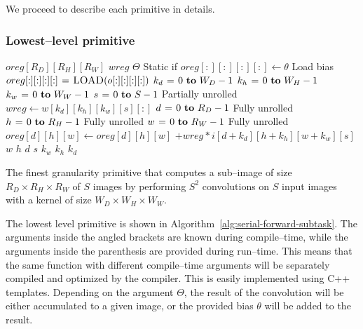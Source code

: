   We proceed to describe each primitive in details.

  \subsubsection{Lowest--level primitive}

  \begin{algorithm}
    {\footnotesize
      \begin{codebox}
        \li {} $oreg[R_D][R_H][R_W]$
        \li {} $wreg$
        \li \If $\Theta$ \Comment Static if
        \li \Then $oreg[:][:][:][:] \gets \theta$ \Comment Load bias
        \li \Else
        \li       $oreg[:][:][:][:] \mathrel{\hspace{1pt}=\hspace{1pt}} \textnormal{\scshape LOAD}(o[:][:][:][:])$
        \End \li {}
        \li {} $k_d \gets 0 \To W_D-1$
        \li   \Do {} $k_h \gets 0 \To W_H-1$
        \li      \Do {} $k_w \gets 0 \To W_W-1$
        \li         \Do {} $s \gets 0 \To S - 1$ \Comment Partially unrolled
        \li         \Do $wreg \gets w[k_d][k_h][k_w][s][:]$
        \li {} $d \gets 0 \To R_D-1$ \Comment Fully unrolled
        \li   \Do {} $h \gets 0 \To R_H-1$ \Comment Fully unrolled
        \li      \Do {} $w \gets 0 \To R_W-1$ \Comment Fully unrolled
        \li         \Do $oreg[d][h][w] \gets oreg[d][h][w]$
        \li             $+ wreg * i[d+k_d][h+k_h][w+k_w][s]$
        \End \li {} $w$
        \End \li {} $h$
        \End \li {} $d$
        \End \li {} $s$
        \End \li {} $k_w$
        \End \li {} $k_h$
        \End \li {} $k_d$
      \end{codebox}
    \caption{The finest granularity primitive that computes a
      sub--image of size $R_D \times R_H \times R_W$ of $S$ images by
      performing $S^2$ convolutions on $S$ input images with a kernel
      of size $W_D \times W_H \times W_W$.}
    \label{alg:serial-forward-subtask}
    }
  \end{algorithm}

  The lowest level primitive is shown in
  Algorithm~\ref{alg:serial-forward-subtask}.  The arguments inside
  the angled brackets are known during compile--time, while the
  arguments inside the parenthesis are provided during run--time.
  This means that the same function with different compile--time
  arguments will be separately compiled and optimized by the compiler.
  This is easily implemented using C++ templates.  Depending on the
  argument $\Theta$, the result of the convolution will be either
  accumulated to a given image, or the provided bias $\theta$ will be
  added to the result.

